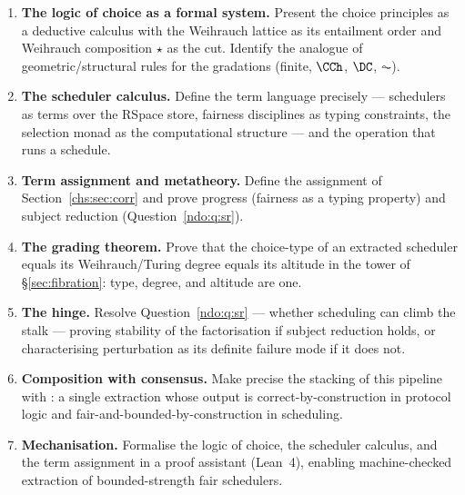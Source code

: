 \begin{enumerate}[label=P\arabic*.,leftmargin=2.4em]
\item \textbf{The logic of choice as a formal system.} Present the choice principles as a deductive calculus with
the Weihrauch lattice \cite{weihrauch} as its entailment order and Weihrauch composition $\star$ as the cut. Identify
the analogue of geometric/structural rules for the gradations (finite, $\CCh$, $\DC$, $\AC$).
\item \textbf{The scheduler calculus.} Define the term language precisely --- schedulers as terms over the RSpace
store, fairness disciplines as typing constraints, the selection monad \cite{escardo} as the computational structure
--- and the operation that runs a schedule.
\item \textbf{Term assignment and metatheory.} Define the assignment of Section~\ref{chs:sec:corr} and prove progress
(fairness as a typing property) and subject reduction (Question~\ref{ndo:q:sr}).
\item \textbf{The grading theorem.} Prove that the choice-type of an extracted scheduler equals its
Weihrauch/Turing degree equals its altitude in the tower of \S\ref{sec:fibration}: type, degree, and altitude are one.
\item \textbf{The hinge.} Resolve Question~\ref{ndo:q:sr} --- whether scheduling can climb the stalk --- proving stability
of the factorisation if subject reduction holds, or characterising perturbation as its definite failure mode if it does
not.
\item \textbf{Composition with consensus.} Make precise the stacking of this pipeline with \cite{consensus}: a single
extraction whose output is correct-by-construction in protocol logic and fair-and-bounded-by-construction in scheduling.
\item \textbf{Mechanisation.} Formalise the logic of choice, the scheduler calculus, and the term assignment in a proof
assistant (Lean~4), enabling machine-checked extraction of bounded-strength fair schedulers.
\end{enumerate}

